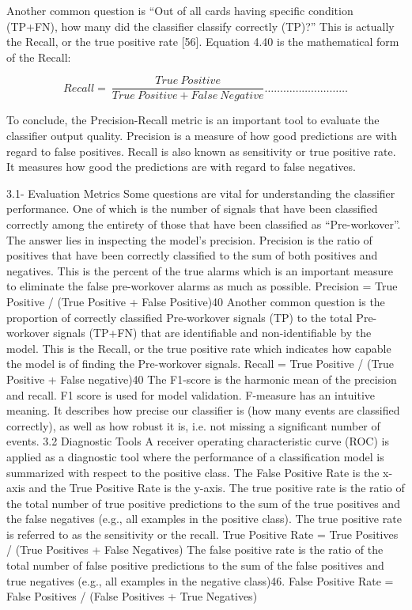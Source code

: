 Another common question is “Out of all cards having specific condition (TP+FN), how many did the classifier classify correctly (TP)?” This is actually the Recall, or the true positive rate [56]. Equation 4.40 is the mathematical form of the Recall:

\begin{equation}
     Recall=\ \frac{True\ Positive}{True\ Positive+False\ Negative}\ldots\ldots\ldots\ldots\ldots\ldots\ldots\ldots\ldots   
\end{equation}
    

To conclude, the Precision-Recall metric is an important tool to evaluate the classifier output quality. Precision is a measure of how good predictions are with regard to false positives. Recall is also known as sensitivity or true positive rate. It measures how good the predictions are with regard to false negatives.

3.1- Evaluation Metrics
Some questions are vital for understanding the classifier performance. One of which is the number of signals that have been classified correctly among the entirety of those that have been classified as “Pre-workover”. The answer lies in inspecting the model’s precision. Precision is the ratio of positives that have been correctly classified to the sum of both positives and negatives. This is the percent of the true alarms which is an important measure to eliminate the false pre-workover alarms as much as possible.
Precision = True Positive / (True Positive + False Positive)40
Another common question is the proportion of correctly classified Pre-workover signals (TP) to the total Pre-workover signals (TP+FN) that are identifiable and non-identifiable by the model. This is the Recall, or the true positive rate which indicates how capable the model is of finding the Pre-workover signals.
Recall = True Positive / (True Positive + False negative)40
The F1-score is the harmonic mean of the precision and recall. F1 score is used for model validation. F-measure has an intuitive meaning. It describes how precise our classifier is (how many events are classified correctly), as well as how robust it is, i.e. not missing a significant number of events.
3.2 Diagnostic Tools
A receiver operating characteristic curve (ROC) is applied as a diagnostic tool where the performance of a classification model is summarized with respect to the positive class. The False Positive Rate is the x-axis and the True Positive Rate is the y-axis.
The true positive rate is the ratio of the total number of true positive predictions to the sum of the true positives and the false negatives (e.g., all examples in the positive class). The true positive rate is referred to as the sensitivity or the recall.
True Positive Rate = True Positives / (True Positives + False Negatives)
The false positive rate is the ratio of the total number of false positive predictions to the sum of the false positives and true negatives (e.g., all examples in the negative class)46.
False Positive Rate = False Positives / (False Positives + True Negatives)


